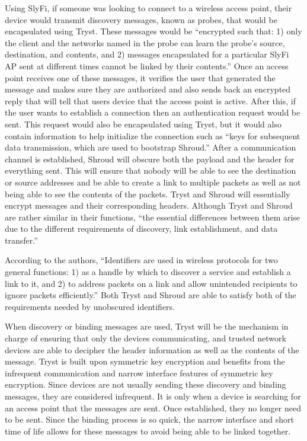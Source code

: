 Using SlyFi, if someone was looking to connect to a wireless access point, their device would transmit discovery messages, known as probes, that would be encapsulated using Tryst. These messages would be “encrypted such that: 1) only the client and the networks named in the probe can learn the probe’s source, destination, and contents, and 2) messages encapsulated for a particular SlyFi AP sent at different times cannot be linked by their contents.” \cite {greenstein2008improving} Once an access point receives one of these messages, it verifies the user that generated the message and makes sure they are authorized and also sends back an encrypted reply that will tell that users device that the access point is active. After this, if the user wants to establish a connection then an authentication request would be sent. This request would also be encapsulated using Tryst, but it would also contain information to help initialize the connection such as “keys for subsequent data transmission, which are used to bootstrap Shroud.” \cite {greenstein2008improving} After a communication channel is established, Shroud will obscure both the payload and the header for everything sent. This will ensure that nobody will be able to see the destination or source addresses and be able to create a link to multiple packets as well as not being able to see the contents of the packets. Tryst and Shroud will essentially encrypt messages and their corresponding headers. Although Tryst and Shroud are rather similar in their functions, “the essential differences between them arise due to the different requirements of discovery, link establishment, and data transfer.” \cite {greenstein2008improving}

\smallskip

According to the authors, “Identifiers are used in wireless protocols for two general functions: 1) as a handle by which to discover a service and establish a link to it, and 2) to address packets on a link and allow unintended recipients to ignore packets efficiently.” \cite {greenstein2008improving} Both Tryst and Shroud are able to satisfy both of the requirements needed by unobscured identifiers. 

\smallskip

When discovery or binding messages are used, Tryst will be the mechanism in charge of ensuring that only the devices communicating, and trusted network devices are able to decipher the header information as well as the contents of the message. Tryst is built upon symmetric key encryption and benefits from the infrequent communication and narrow interface features of symmetric key encryption. Since devices are not usually sending these discovery and binding messages, they are considered infrequent. It is only when a device is searching for an access point that the messages are sent. Once established, they no longer need to be sent. Since the binding process is so quick, the narrow interface and short time of life allows for these messages to avoid being able to be linked together.


